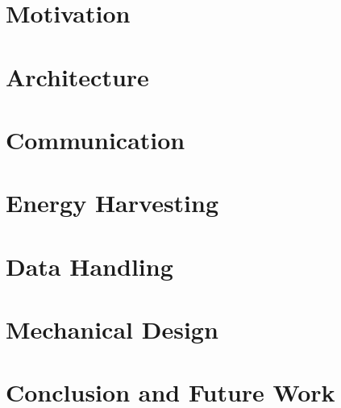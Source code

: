 \documentclass[journal]{IEEEtran}
\begin{document}
\section{Motivation}

\section{Architecture}

\section{Communication}


\section{Energy Harvesting}


\section{Data Handling}


\section{Mechanical Design}


\section{Conclusion and Future Work}


\ifCLASSOPTIONcaptionsoff
  \newpage
\fi





%
%
%
\printbibliography



\end{document}
